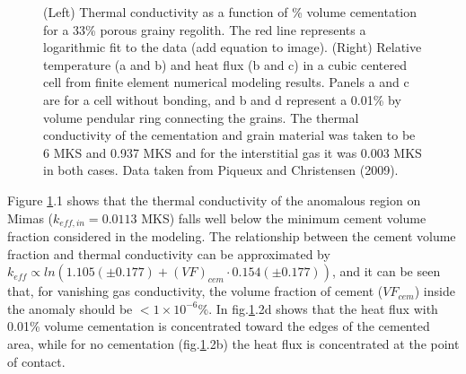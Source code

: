 \documentclass[11pt]{article} %
\begin{document}
	\begin{figure}[h] 
	\centering
		\caption{(Left) Thermal conductivity as a function of \% volume cementation for a 33\% porous grainy regolith. The red line represents a logarithmic fit to the data (add equation to image).  (Right) Relative temperature (a and b) and heat flux (b and c)  in a cubic centered cell from finite element numerical modeling results. Panels a and c are for a cell without bonding, and b and d represent a 0.01\% by volume pendular ring connecting the grains. The thermal conductivity of the cementation and grain material was taken to be 6 MKS and 0.937 MKS and for the interstitial gas it was 0.003 MKS in both cases. Data taken from Piqueux and Christensen (2009).}\label{fig:PCresults}
	\end{figure}

	Figure \ref{fig:PCresults}.1 shows that the thermal conductivity of the anomalous region on Mimas ($k_{eff, in} = 0.0113$ MKS) falls well below the minimum cement volume fraction considered in the modeling. The relationship between the cement volume fraction and thermal conductivity can be approximated by $k_{eff} \varpropto ln\left(1.105 (\pm 0.177)+ (VF)_{cem}\cdot 0.154 (\pm 0.177) \right)$, and it can be seen that, for vanishing gas conductivity, the volume fraction of cement ($VF_{cem}$) inside the anomaly should be $<1\times10^{-6} \%$. In fig.\ref{fig:PCresults}.2d shows that the heat flux with 0.01\% volume cementation is concentrated toward the edges of the cemented area, while for no cementation (fig.\ref{fig:PCresults}.2b) the heat flux is concentrated at the point of contact. 
	
\end{document}
